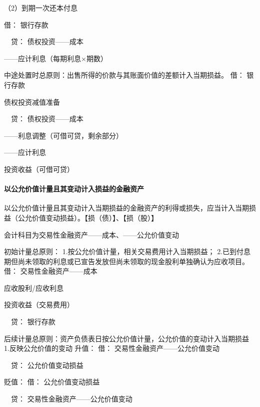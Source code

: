 \documentclass[UTF8,12pt]{ctexart}
\newenvironment{Dr}{\noindent 借：}{\par}
\newenvironment{Cr}{\noindent \ \ 贷：}{\par}
\numberwithin{equation}{section} %
\numberwithin{figure}{section}
\numberwithin{table}{section}
\begin{document}
	（2）到期一次还本付息
	
	\begin{Dr}
		银行存款
	\end{Dr}
	\begin{Cr}
		债权投资——成本
		
		——应计利息（每期利息×期数）
	\end{Cr}
	
	中途处置时总原则：出售所得的价款与其账面价值的差额计入当期损益。
	\begin{Dr}
		银行存款
		
		债权投资减值准备
	\end{Dr}
	\begin{Cr}
		债权投资——成本
		
		——利息调整（可借可贷，剩余部分）
		
		——应计利息
		
		投资收益（可借可贷）
	\end{Cr}

	
	
	
	\paragraph{以公允价值计量且其变动计入损益的金融资产}
	以公允价值计量且其变动计入当期损益的金融资产的利得或损失，应当计入当期损益（公允价值变动损益）。【损（债）】、【损（股）】
	
	会计科目为交易性金融资产——成本、——公允价值变动
	
	初始计量总原则：
	1.按公允价值计量，相关交易费用计入当期损益；
	2.已到付息期但尚未领取的利息或已宣告发放但尚未领取的现金股利单独确认为应收项目。
	\begin{Dr}
		交易性金融资产——成本
		
		应收股利/应收利息
		
		投资收益（交易费用）
	\end{Dr}
	\begin{Cr}
		银行存款
	\end{Cr}

	
	后续计量总原则：资产负债表日按公允价值计量，公允价值的变动计入当期损益
	1.反映公允价值的变动
	升值：
	\begin{Dr}
		交易性金融资产——公允价值变动
	\end{Dr}
	\begin{Cr}
		公允价值变动损益
	\end{Cr}

	贬值：
	\begin{Dr}
		公允价值变动损益
	\end{Dr}
	\begin{Cr}
		交易性金融资产——公允价值变动
	\end{Cr}
\end{document}

